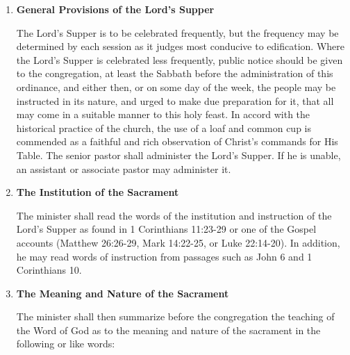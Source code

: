 \documentclass[
]{book}
\begin{document}
\begin{enumerate}
\def\labelenumi{\arabic{enumi}.}
\item
  \protect\hypertarget{60}{\href{}{}}\textbf{General Provisions of the Lord's Supper}

  The Lord's Supper is to be celebrated frequently, but the frequency may be determined by each session as it judges most conducive to edification. Where the Lord's Supper is celebrated less frequently, public notice should be given to the congregation, at least the Sabbath before the administration of this ordinance, and either then, or on some day of the week, the people may be instructed in its nature, and urged to make due preparation for it, that all may come in a suitable manner to this holy feast. In accord with the historical practice of the church, the use of a loaf and common cup is commended as a faithful and rich observation of Christ's commands for His Table. The senior pastor shall administer the Lord's Supper. If he is unable, an assistant or associate pastor may administer it.
\item
  \textbf{The Institution of the Sacrament}

  The minister shall read the words of the institution and instruction of the Lord's Supper as found in 1 Corinthians 11:23-29 or one of the Gospel accounts (Matthew 26:26-29, Mark 14:22-25, or Luke 22:14-20). In addition, he may read words of instruction from passages such as John 6 and 1 Corinthians 10.
\item
  \textbf{The Meaning and Nature of the Sacrament}

  The minister shall then summarize before the congregation the teaching of the Word of God as to the meaning and nature of the sacrament in the following or like words:


\end{enumerate}
\end{document}
